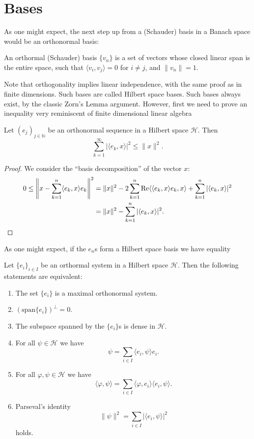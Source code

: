 \documentclass[twoside,symmetric, openany, 12pt]{./tuftebook}
\theoremstyle{definition}
\theoremstyle{definition}
\theoremstyle{definition}
\newenvironment{parts}{\begin{enumerate}[label=(\alph*)]}{\end{enumerate}}
\newcommand{\N}{\mathbb{N}}
\begin{document}
\section{Bases}
As one might expect, the next step up from a (Schauder) basis in a Banach space would be an orthonormal basis:
\begin{Definition}
	An orthormal (Schauder) basis $\{v_n\}$ is a set of vectors whose closed linear span is the entire space, such that $\langle v_i, v_j\rangle =0$ for $i\neq j$, and $\|v_n\| = 1$.
\end{Definition}
Note that orthogonality implies linear independence, with the same proof as in finite dimensions. Such bases are called Hilbert space bases. Such bases always exist, by the classic Zorn's Lemma argument. However, first we need to prove an inequality very reminiscent of finite dimensional linear algebra
\begin{Theorem}
	Let $(e_j)_{j\in \N}$ be an orthonormal sequence in a Hilbert space $\mathcal{H}$. Then
	\[
		\sum_{k=1}^\infty |\langle e_k, x\rangle|^2 \le \|x\|^2
	.\] 
\end{Theorem}
\begin{proof}
	We consider the ``basis decomposition'' of the vector $x$:
	\begin{align*}
		0\le \left\|x - \sum_{k=1}^n \langle e_k, x\rangle e_k\right\|^2 &=  \|x\|^2 - 2\sum_{k=1}^n \Re \langle\langle e_k, x\rangle e_k, x\rangle + \sum_{k=1}^n |\langle e_k, x\rangle|^2\\
										 &= \|x\|^2 - \sum_{k=1}^n |\langle e_k, x\rangle|^2.\qedhere
	\end{align*}
\end{proof}
As one might expect, if the $e_n$s form a Hilbert space basis we have equality
\begin{Theorem}
	Let $\{e_i\}_{i\in I}$ be an orthormal system in a Hilbert space $\mathcal{H}$. Then the following statements are equivalent:
	\begin{parts}
	\item The set $\{e_i\} $ is a maximal orthonormal system. 
	\item $(\text{span}\{e_i\})^\perp = 0$.
	\item The subspace spanned by the $\{e_i\} $s is dense in $\mathcal{H}$.
	\item For all $\psi\in \mathcal{H}$ we have
		\[
			\psi = \sum_{i\in I}\langle e_i, \psi\rangle e_i
		.\] 
	\item For all $\varphi, \psi\in \mathcal{H}$ we have
		\[
		\langle \varphi, \psi\rangle = \sum_{i\in I}\langle \varphi, e_i\rangle \langle e_i, \psi\rangle
		.\] 
	\item Parseval's identity
		\[
			\|\psi\|^2 = \sum_{i\in I}|\langle e_i, \psi\rangle|^2
		\]
		holds.
	\end{parts}
\end{Theorem}
\end{document}
